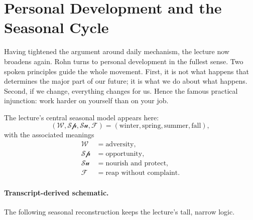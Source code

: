 \section{Personal Development and the Seasonal Cycle}

Having tightened the argument around daily mechanism, the lecture now broadens again. Rohn turns to personal development in the fullest sense. Two spoken principles guide the whole movement. First, it is not what happens that determines the major part of our future; it is what we do about what happens. Second, if we change, everything changes for us. Hence the famous practical injunction: work harder on yourself than on your job.

The lecture's central seasonal model appears here:
\begin{equation}
(\mathcal W,\mathcal{Sp},\mathcal{Su},\mathcal F)
=
(\text{winter},\text{spring},\text{summer},\text{fall}),
\end{equation}
with the associated meanings
\begin{align}
\mathcal W &= \text{adversity},\\
\mathcal{Sp} &= \text{opportunity},\\
\mathcal{Su} &= \text{nourish and protect},\\
\mathcal F &= \text{reap without complaint}.
\end{align}

\paragraph{Transcript-derived schematic.} The following seasonal reconstruction keeps the lecture's tall, narrow logic.

